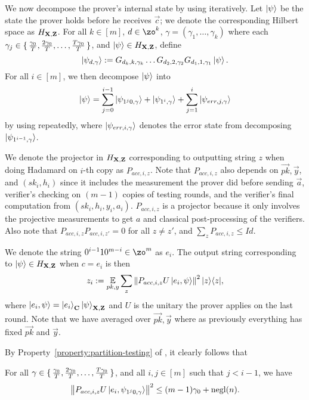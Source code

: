 We now decompose the prover's internal state by using  iteratively.
Let $\ket{\psi}$ be the state the prover holds before he receives $\vec{c}$;
we denote the corresponding Hilbert space as $H_{\mathbf{X},\mathbf{Z}}$.
For all $k \in [m]$, $d\in \zo^k$, $\gamma=(\gamma_1, \ldots, \gamma_k)$ where each $\gamma_j\in\set{\frac{\gamma_0}{T},\frac{2\gamma_0}{T},\dots,\frac{T\gamma_0}{T}}$,  
and $\ket{\psi} \in H_{\mathbf{X},\mathbf{Z}}$, define $$\ket{\psi_{d,\gamma}}:= G_{d_k,k,\gamma_k}\ldots G_{d_2,2,\gamma_2} G_{d_1,1,\gamma_1} \ket{\psi}.$$
For all $i\in[m]$, we then decompose $\ket{\psi}$ into
\begin{equation}
	\label{eq:partition-string}
	\ket{\psi}=\sum_{j=0}^{i-1} \ket{\psi_{1^j0,\gamma}} +\ket{\psi_{1^i,\gamma}} +\sum_{j=1}^{i}\ket{\psi_{err,j,\gamma}}
\end{equation}
by using  repeatedly,  where $\ket{\psi_{err,i,\gamma}}$ denotes the error state from decomposing $\ket{\psi_{1^{i-1},\gamma}}$.

We denote the projector in $H_{\mathbf{X},\mathbf{Z}}$ corresponding to outputting string $z$ when doing Hadamard on $i$-th copy as $P_{acc,i,z}$.
Note that $P_{acc,i,z}$ also depends on $\vec{pk}, \vec{y}$, and $(sk_i, h_i)$ since it includes the measurement the prover did before sending $\vec{a}$,  verifier's checking on $(m-1)$ copies of testing rounds, and  the verifier's final computation from $(sk_i,h_i,y_i,a_i)$. $P_{acc,i,z}$ is a projector because it only involves the projective measurements to get $a$ and classical post-processing of the verifiers. Also note that  $P_{acc,i,z} P_{acc,i,z'}=0$ for all $z\neq z'$, and $\sum_z P_{acc,i,z} \leq Id$.

We denote the string $0^{i-1}10^{m-i} \in \zo^m$ as $e_i$. The output string corresponding to $\ket{\psi} \in H_{\mathbf{X},\mathbf{Z}}$ when $c=e_i$ is then
\begin{equation}
	\label{eq:zi-def}
	z_i:= \operatorname*{\mathbb{E}}_{pk,y} \sum_z \left\lVert P_{acc,i,z} U\ket{e_i,\psi}\right\rVert^2|z\rangle\langle z|,
\end{equation}
 where $\ket{e_i,\psi}=\ket{e_i}_{\mathbf{C}}\ket{\psi}_{\mathbf{X},\mathbf{Z}}$ and $U$ is the unitary the prover applies on the last round.
Note that we have averaged over $\vec{pk}, \vec{y}$ where as previously everything has fixed $\vec{pk}$ and $\vec{y}$.

By Property~\ref{property:partition-testing} of ,
it clearly follows that 
\begin{cor}
	\label{lem:partition-testing}
	For all $\gamma\in\set{\frac{\gamma_0}{T},\frac{2\gamma_0}{T},\dots,\frac{T\gamma_0}{T}}$, and all $i,j\in[m]$ such that $j<i-1$, we have
	$$\left\lVert P_{acc,i,z} U \ket{e_i, \psi_{1^j0,\gamma}}\right\rVert^2\leq (m-1)\gamma_0+\operatorname{negl}(n).$$
\end{cor}

